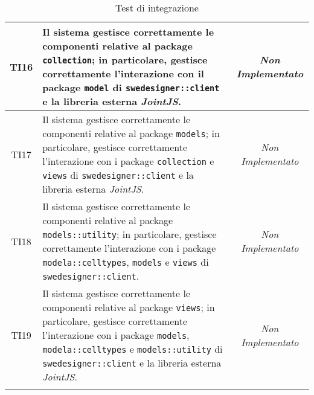 \begin{longtable}{|c|>{}m{8cm}|c|}
\hypertarget{TI16}{TI16} & Il sistema gestisce correttamente le componenti relative al package \texttt{collection}; in particolare, gestisce correttamente l'interazione con il package \texttt{model} di \texttt{swedesigner::client} e la libreria esterna \emph{JointJS}. & \textit{Non Implementato}\\ \hline
\hypertarget{TI17}{TI17} & Il sistema gestisce correttamente le componenti relative al package \texttt{models}; in particolare, gestisce correttamente l'interazione con i package \texttt{collection} e \texttt{views} di \texttt{swedesigner::client} e la libreria esterna \emph{JointJS}. & \textit{Non Implementato}\\ \hline
\hypertarget{TI18}{TI18} & Il sistema gestisce correttamente le componenti relative al package \texttt{models::utility}; in particolare, gestisce correttamente l'interazione con i package \texttt{modela::celltypes}, \texttt{models} e \texttt{views} di \texttt{swedesigner::client}. & \textit{Non Implementato}\\ \hline
\hypertarget{TI19}{TI19} & Il sistema gestisce correttamente le componenti relative al package \texttt{views}; in particolare, gestisce correttamente l'interazione con i package \texttt{models}, \texttt{modela::celltypes} e \texttt{models::utility} di \texttt{swedesigner::client} e la libreria esterna \emph{JointJS}. & \textit{Non Implementato}\\ \hline
\caption[Test di integrazione]{Test di integrazione}
\label{tab:integr}
\end{longtable}
\clearpage

